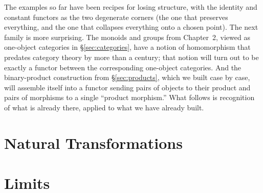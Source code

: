 \noindent The examples so far have been recipes for losing
structure, with the identity and constant functors as the two
degenerate corners (the one that preserves everything, and the
one that collapses everything onto a chosen point). The next
family is more surprising. The monoids and groups from
Chapter~2, viewed as one-object categories in
\S\ref{sec:categories}, have a notion of homomorphism that
predates category theory by more than a century; that notion
will turn out to be exactly a functor between the corresponding
one-object categories. And the binary-product construction from
\S\ref{sec:products}, which we built case by case, will assemble
itself into a functor sending pairs of objects to their product
and pairs of morphisms to a single ``product morphism.'' What
follows is recognition of what is already there, applied to what
we have already built.

\section{Natural Transformations}\label{sec:nat-trans}

\section{Limits}\label{sec:limits}

